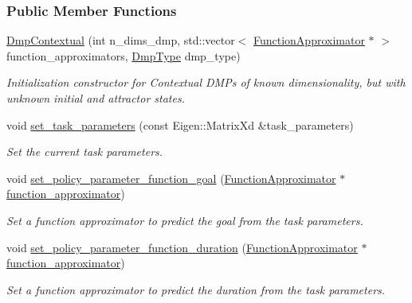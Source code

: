 \subsubsection*{Public Member Functions}
\begin{DoxyCompactItemize}
\item 
\hyperlink{classDmpBbo_1_1DmpContextual_a7ee70d54aba859cad05e07f0d2b1af88}{Dmp\+Contextual} (int n\+\_\+dims\+\_\+dmp, std\+::vector$<$ \hyperlink{classDmpBbo_1_1FunctionApproximator}{Function\+Approximator} $\ast$ $>$ function\+\_\+approximators, \hyperlink{group__Dmps_gaccba8d09ec99ae66e469b3511bb232a4}{Dmp\+Type} dmp\+\_\+type)
\begin{DoxyCompactList}\small\item\em Initialization constructor for Contextual D\+M\+Ps of known dimensionality, but with unknown initial and attractor states. \end{DoxyCompactList}\item 
void \hyperlink{classDmpBbo_1_1DmpContextual_a8b284cae90015038c405e257ffaed70e}{set\+\_\+task\+\_\+parameters} (const Eigen\+::\+Matrix\+Xd \&task\+\_\+parameters)
\begin{DoxyCompactList}\small\item\em Set the current task parameters. \end{DoxyCompactList}\item 
void \hyperlink{classDmpBbo_1_1DmpContextual_aa9d01de1abb31f24cf3f6a4c1177a97c}{set\+\_\+policy\+\_\+parameter\+\_\+function\+\_\+goal} (\hyperlink{classDmpBbo_1_1FunctionApproximator}{Function\+Approximator} $\ast$\hyperlink{classDmpBbo_1_1Dmp_ac428e2dd848c99ddaf517f2dbacdf3ad}{function\+\_\+approximator})
\begin{DoxyCompactList}\small\item\em Set a function approximator to predict the goal from the task parameters. \end{DoxyCompactList}\item 
void \hyperlink{classDmpBbo_1_1DmpContextual_a41254078cdcd87e0fccfa8b8fb7c4ac5}{set\+\_\+policy\+\_\+parameter\+\_\+function\+\_\+duration} (\hyperlink{classDmpBbo_1_1FunctionApproximator}{Function\+Approximator} $\ast$\hyperlink{classDmpBbo_1_1Dmp_ac428e2dd848c99ddaf517f2dbacdf3ad}{function\+\_\+approximator})
\begin{DoxyCompactList}\small\item\em Set a function approximator to predict the duration from the task parameters. \end{DoxyCompactList}\item 

\end{DoxyCompactItemize}
